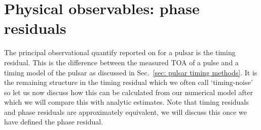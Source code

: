 \documentclass[../full_thesis/full_thesis.tex]{subfiles}
\begin{document}
%
%
%

\section{Physical observables: phase residuals}
\label{sec: timing residuals}

The principal observational quantify reported on for a pulsar is the timing
residual. This is the difference between the measured TOA of a pulse and a
timing model of the pulsar as discussed in Sec.~\ref{sec: pulsar timing
methods}. It is the remaining structure in the timing residual which we
often call `timing-noise' so let us now discuss how this can be calculated
from our numerical model after which we will compare this with analytic
estimates. Note that timing residuals and phase residuals are approximately
equivalent, we will discuss this once we have defined the phase residual.
\end{document}
